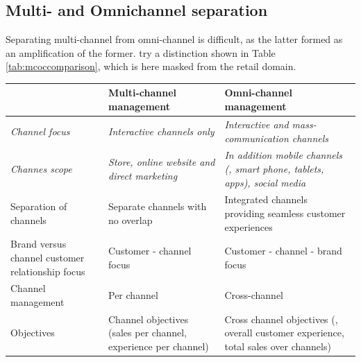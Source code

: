 \subsection{Multi- and Omnichannel separation}
\label{app:mcoc2}
	Separating multi-channel from omni-channel is difficult, as the latter formed as an amplification of the former. \cite{vorhoef2015retail} try a distinction shown in Table \ref{tab:mcoccomparison}, which is here masked from the retail domain. 
\begin{table}[caption={Multi- and omni-channel comparison}, label={tab:mcoccomparison}]
	\centering
	\begin{tabular}{p{3cm}| p{5cm} |p{5cm}} 
		& \textbf{Multi-channel management}                                   & \textbf{Omni-channel management}                                                              \\ \hline
		\textit{Channel focus}                         & \textit{Interactive channels only}                                    & \textit{Interactive and mass-communication channels}                                                   \\ \hline
		\textit{Channes scope}                                 & \textit{Store, online website and direct marketing}                          & \textit{In addition mobile channels (\ie, smart phone, tablets, apps), social media}                   \\ \hline
		{Separation of channels}                           & Separate channels with no overlap                                  & Integrated channels providing seamless customer experiences                                   \\ \hline
		{Brand versus channel customer relationship focus} & Customer - channel focus                                            & Customer - channel - brand  focus                                                              \\ \hline
		{Channel management}                               & Per channel                                                         & Cross-channel                                                                                 \\ \hline
		{Objectives}                                       & Channel objectives (\ie sales per channel, experience per channel)& Cross channel objectives (\ie, overall customer experience, total sales over channels) \\
		
	\end{tabular}
\end{table}
